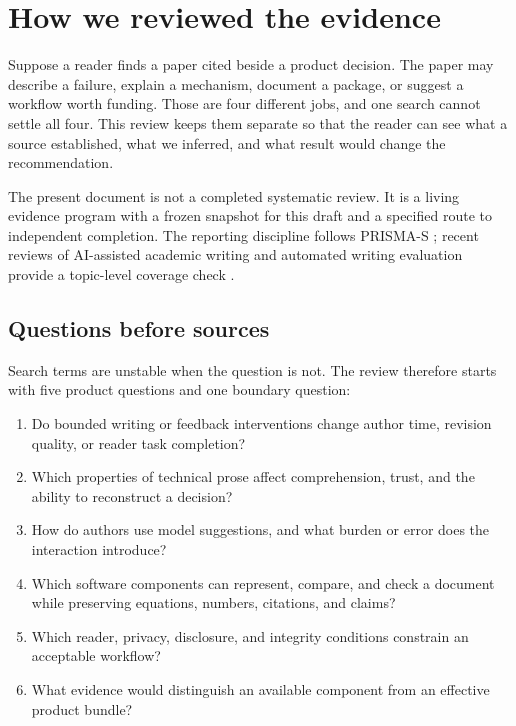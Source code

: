 \chapter{How we reviewed the evidence}
\label{ch:evidence-method}

Suppose a reader finds a paper cited beside a product decision. The paper may
describe a failure, explain a mechanism, document a package, or suggest a
workflow worth funding. Those are four different jobs, and one search cannot
settle all four. This review keeps them separate so that the reader can see
what a source established, what we inferred, and what result would change the
recommendation.

The present document is not a completed systematic review. It is a living
evidence program with a frozen snapshot for this draft and a specified route to
independent completion. The reporting discipline follows PRISMA-S
\citep{rethlefsen2021prismas}; recent reviews of AI-assisted academic writing
and automated writing evaluation provide a topic-level coverage check
\citep{meng2026systematic,abudalfa2026awe}.

\section{Questions before sources}
\label{sec:method-questions}

Search terms are unstable when the question is not. The review therefore
starts with five product questions and one boundary question:

\begin{enumerate}
\item Do bounded writing or feedback interventions change author time,
      revision quality, or reader task completion?
\item Which properties of technical prose affect comprehension, trust, and
      the ability to reconstruct a decision?
\item How do authors use model suggestions, and what burden or error does the
      interaction introduce?
\item Which software components can represent, compare, and check a document
      while preserving equations, numbers, citations, and claims?
\item Which reader, privacy, disclosure, and integrity conditions constrain an
      acceptable workflow?
\item What evidence would distinguish an available component from an
      effective product bundle?
\end{enumerate}

